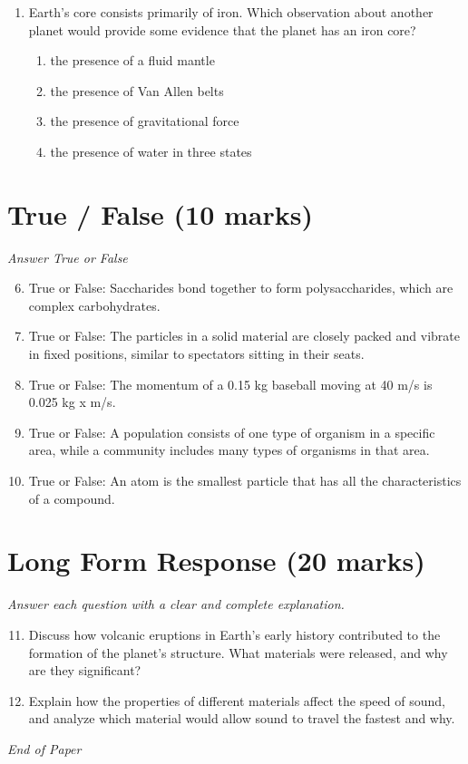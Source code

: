 \documentclass[12pt]{article}
\begin{document}
\begin{enumerate}[label=\arabic*.]
\begin{enumerate}[label=(\alph*)]
    \item The Sun is at the center of the Milky Way Galaxy.
    \item The Sun is a medium-sized star near the edge of the Milky Way Galaxy.
    \item The Sun has the Milky Way and several other galaxies moving in orbits around it.
\end{enumerate}
\item Earth's core consists primarily of iron. Which observation about another planet would provide some evidence that the planet has an iron core?
\begin{enumerate}[label=(\alph*)]
    \item the presence of a fluid mantle
    \item the presence of Van Allen belts
    \item the presence of gravitational force
    \item the presence of water in three states
\end{enumerate}
\end{enumerate}

\section*{True / False (10 marks)}
\textit{Answer True or False}
\begin{enumerate}[label=\arabic*.]
\setcounter{enumi}{5}
\item True or False: Saccharides bond together to form polysaccharides, which are complex carbohydrates.
\item True or False: The particles in a solid material are closely packed and vibrate in fixed positions, similar to spectators sitting in their seats.
\item True or False: The momentum of a 0.15 kg baseball moving at 40 m/s is 0.025 kg x m/s.
\item True or False: A population consists of one type of organism in a specific area, while a community includes many types of organisms in that area.
\item True or False: An atom is the smallest particle that has all the characteristics of a compound.
\end{enumerate}

\section*{Long Form Response (20 marks)}
\textit{Answer each question with a clear and complete explanation.}
\begin{enumerate}[label=\arabic*.]
\setcounter{enumi}{10}
\item Discuss how volcanic eruptions in Earth's early history contributed to the formation of the planet's structure. What materials were released, and why are they significant?
\item Explain how the properties of different materials affect the speed of sound, and analyze which material would allow sound to travel the fastest and why.
\end{enumerate}

\vfill
\noindent\textit{End of Paper}
\end{document}
